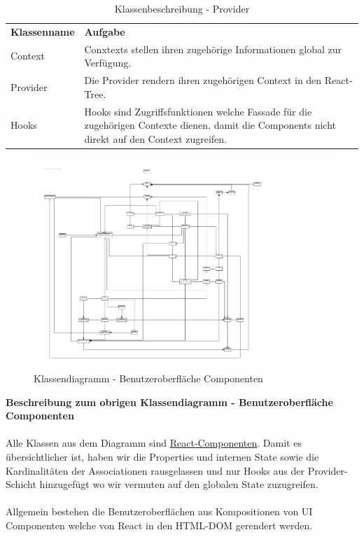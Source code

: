 \begin{table}[H]
	\centering
	\begin{tabularx}{\textwidth}{X X}
		\rowcolor[HTML]{C0C0C0} 
		\textbf{Klassenname} & \textbf{Aufgabe} \\
		Context & Conxtexts stellen ihren zugehörige Informationen global zur Verfügung.  \\
		\rowcolor[HTML]{E7E7E7} 
		Provider & Die Provider rendern ihren zugehörigen Context in den React-Tree. \\
		Hooks & Hooks sind Zugriffsfunktionen welche Fassade für die zugehörigen Contexte dienen, damit die Components nicht direkt auf den Context zugreifen. \\
	\end{tabularx}
	\caption{Klassenbeschreibung - Provider}
	\label{table:klassenbeschreibung-provider}
\end{table}
\newpage

\begin{figure}[H]
	\hspace{-3cm}
	\includegraphics[scale = 0.9]{./img/diagrams/web-class}
	\caption{Klassendiagramm - Benutzeroberfläche Componenten}
\end{figure}
\newpage

\textbf{Beschreibung zum obrigen Klassendiagramm - Benutzeroberfläche Componenten} \\ \\
Alle Klassen aus dem Diagramm sind \href{https://reactjs.org/docs/components-and-props.html}{React-Componenten}. Damit es übersichtlicher ist, haben wir die Properties und internen State sowie die Kardinalitäten der Associationen rausgelassen und nur Hooks aus der Provider-Schicht hinzugefügt wo wir vermuten auf den globalen State zuzugreifen. \\ \\
Allgemein bestehen die Benutzeroberflächen aus Kompositionen von UI Componenten welche von React in den HTML-DOM gerendert werden. 
 
